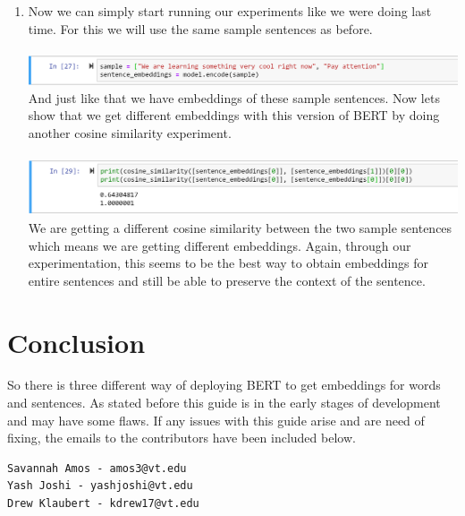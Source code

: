 \documentclass{article}
\begin{document}
\begin{enumerate}
\begin{enumerate}
        \item[] Now we can simply start running our experiments like we were doing last time.  For this we will use the same sample sentences as before.\\
        \vspace{.1cm}\\
        \includegraphics[scale = .71]{sentence_bert_example.png}
        \vspace{.1cm}\\
        And just like that we have embeddings of these sample sentences.  Now lets show that we get different embeddings with this version of BERT by doing another cosine similarity experiment.\\
        \vspace{.1cm}\\
        \includegraphics[scale = .715]{sentence_bert_cos.png}
        \vspace{.1cm}\\
        We are getting a different cosine similarity between the two sample sentences which means we are getting different embeddings.  Again, through our experimentation, this seems to be the best way to obtain embeddings for entire sentences and still be able to preserve the context of the sentence.
    \end{enumerate}
\end{enumerate} 

\section*{Conclusion}
So there is three different way of deploying BERT to get embeddings for words and sentences.  As stated before this guide is in the early stages of development and may have some flaws.  If any issues with this guide arise and are need of fixing, the emails to the contributors have been included below.

\begin{verbatim}
Savannah Amos - amos3@vt.edu
Yash Joshi - yashjoshi@vt.edu
Drew Klaubert - kdrew17@vt.edu
\end{verbatim}
\end{document}
